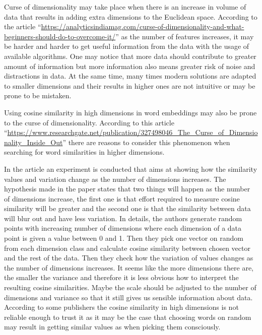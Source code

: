 \documentclass[12pt,]{book}
\begin{document}
Curse of dimensionality may take place when there is an increase in
volume of data that results in adding extra dimensions to the Euclidean
space. According to the article
``\url{https://analyticsindiamag.com/curse-of-dimensionality-and-what-beginners-should-do-to-overcome-it/}''
as the number of features increases, it may be harder and harder to get
useful information from the data with the usage of available algorithms.
One may notice that more data should contribute to greater amount of
information but more information also means greater risk of noise and
distractions in data. At the same time, many times modern solutions are
adapted to smaller dimensions and their results in higher ones are not
intuitive or may be prone to be mistaken.

Using cosine similarity in high dimensions in word embeddings may also
be prone to the curse of dimensionality. According to this article
``\url{https://www.researchgate.net/publication/327498046_The_Curse_of_Dimensionality_Inside_Out}''
there are reasons to consider this phenomenon when searching for word
similarities in higher dimensions.

In the article an experiment is conducted that aims at showing how the
similarity values and variation change as the number of dimensions
increases. The hypothesis made in the paper states that two things will
happen as the number of dimensions increase, the first one is that
effort required to measure cosine similarity will be greater and the
second one is that the similarity between data will blur out and have
less variation. In details, the authors generate random points with
increasing number of dimensions where each dimension of a data point is
given a value between 0 and 1. Then they pick one vector on random from
each dimension class and calculate cosine similarity between chosen
vector and the rest of the data. Then they check how the variation of
values changes as the number of dimensions increases. It seems like the
more dimensions there are, the smaller the variance and therefore it is
less obvious how to interpret the resulting cosine similarities. Maybe
the scale should be adjusted to the number of dimensions and variance so
that it still gives us sensible information about data. According to
some publishers the cosine similarity in high dimensions is not reliable
enough to trust it as it may be the case that choosing words on random
may result in getting similar values as when picking them consciously.
\newline
\end{document}

